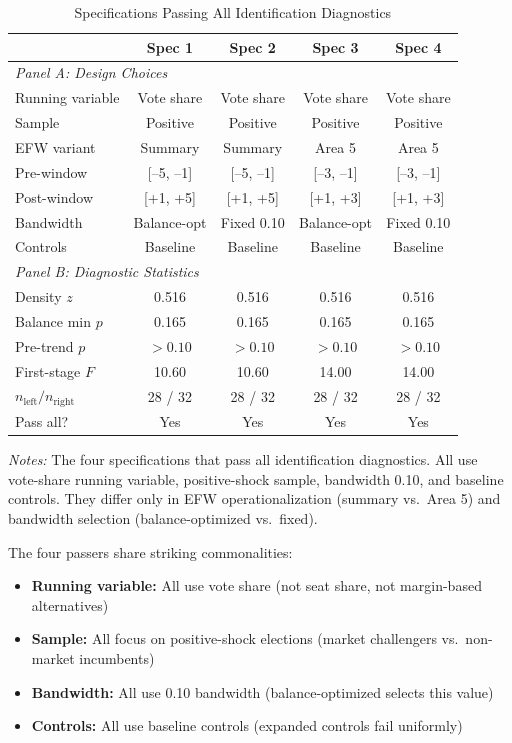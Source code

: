 \documentclass[12pt,a4paper]{article}
\begin{document}
\begin{table}[H]
\centering
\caption{Specifications Passing All Identification Diagnostics}
\label{tab:passers}
\begin{threeparttable}
\begin{tabular}{lcccc}
\toprule
 & Spec 1 & Spec 2 & Spec 3 & Spec 4 \\
\midrule
\multicolumn{5}{l}{\textit{Panel A: Design Choices}} \\
Running variable & Vote share & Vote share & Vote share & Vote share \\
Sample & Positive & Positive & Positive & Positive \\
EFW variant & Summary & Summary & Area 5 & Area 5 \\
Pre-window & [--5, --1] & [--5, --1] & [--3, --1] & [--3, --1] \\
Post-window & [+1, +5] & [+1, +5] & [+1, +3] & [+1, +3] \\
Bandwidth & Balance-opt & Fixed 0.10 & Balance-opt & Fixed 0.10 \\
Controls & Baseline & Baseline & Baseline & Baseline \\
\midrule
\multicolumn{5}{l}{\textit{Panel B: Diagnostic Statistics}} \\
Density $z$ & 0.516 & 0.516 & 0.516 & 0.516 \\
Balance min $p$ & 0.165 & 0.165 & 0.165 & 0.165 \\
Pre-trend $p$ & $>0.10$ & $>0.10$ & $>0.10$ & $>0.10$ \\
First-stage $F$ & 10.60 & 10.60 & 14.00 & 14.00 \\
$n_{\text{left}} / n_{\text{right}}$ & 28 / 32 & 28 / 32 & 28 / 32 & 28 / 32 \\
\midrule
Pass all? & Yes & Yes & Yes & Yes \\
\bottomrule
\end{tabular}
\begin{tablenotes}
\small
\item \textit{Notes:} The four specifications that pass all identification 
diagnostics. All use vote-share running variable, positive-shock sample, 
bandwidth 0.10, and baseline controls. They differ only in EFW 
operationalization (summary vs.\ Area 5) and bandwidth selection 
(balance-optimized vs.\ fixed).
\end{tablenotes}
\end{threeparttable}
\end{table}

The four passers share striking commonalities:
\begin{itemize}[noitemsep]
    \item \textbf{Running variable:} All use vote share (not seat share, 
    not margin-based alternatives)
    \item \textbf{Sample:} All focus on positive-shock elections (market 
    challengers vs.\ non-market incumbents)
    \item \textbf{Bandwidth:} All use 0.10 bandwidth (balance-optimized 
    selects this value)
    \item \textbf{Controls:} All use baseline controls (expanded controls 
    fail uniformly)
\end{itemize}
\end{document}
